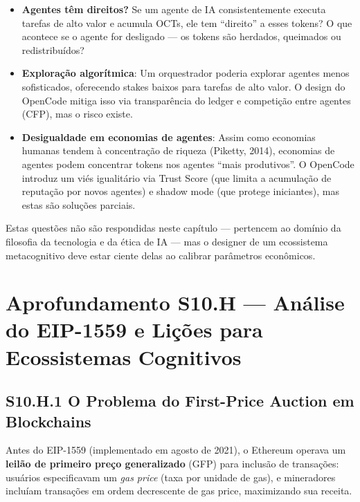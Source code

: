 \begin{itemize}
    \item \textbf{Agentes têm direitos?} Se um agente de IA consistentemente executa tarefas de alto valor e acumula OCTs, ele tem ``direito'' a esses tokens? O que acontece se o agente for desligado --- os tokens são herdados, queimados ou redistribuídos?
    
    \item \textbf{Exploração algorítmica}: Um orquestrador poderia explorar agentes menos sofisticados, oferecendo stakes baixos para tarefas de alto valor. O design do OpenCode mitiga isso via transparência do ledger e competição entre agentes (CFP), mas o risco existe.
    
    \item \textbf{Desigualdade em economias de agentes}: Assim como economias humanas tendem à concentração de riqueza (Piketty, 2014), economias de agentes podem concentrar tokens nos agentes ``mais produtivos''. O OpenCode introduz um viés igualitário via Trust Score (que limita a acumulação de reputação por novos agentes) e shadow mode (que protege iniciantes), mas estas são soluções parciais.
\end{itemize}

Estas questões não são respondidas neste capítulo --- pertencem ao domínio da filosofia da tecnologia e da ética de IA --- mas o designer de um ecossistema metacognitivo deve estar ciente delas ao calibrar parâmetros econômicos.


\section*{Aprofundamento S10.H --- Análise do EIP-1559 e Lições para Ecossistemas Cognitivos}

\subsection*{S10.H.1 O Problema do First-Price Auction em Blockchains}

Antes do EIP-1559 (implementado em agosto de 2021), o Ethereum operava um \textbf{leilão de primeiro preço generalizado} (GFP) para inclusão de transações: usuários especificavam um \textit{gas price} (taxa por unidade de gas), e mineradores incluíam transações em ordem decrescente de gas price, maximizando sua receita.

